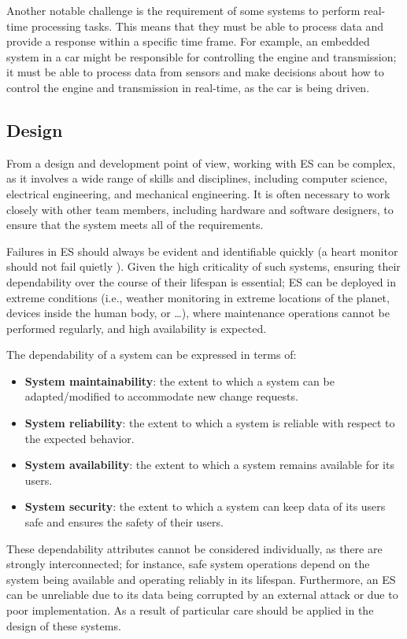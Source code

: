 Another notable challenge is the requirement of some systems to perform real-time processing tasks. This means that they must be able to process data and provide a response within a specific time frame. For example, an embedded system in a car might be responsible for controlling the engine and transmission; it must be able to process data from sensors and make decisions about how to control the engine and transmission in real-time, as the car is being driven.

\subsection{Design}
From a design and development point of view, working with ES can be complex, as it involves a wide range of skills and disciplines, including computer science, electrical engineering, and mechanical engineering. It is often necessary to work closely with other team members, including hardware and software designers, to ensure that the system meets all of the requirements.

Failures in ES should always be evident and identifiable quickly (a heart monitor should not fail quietly \cite{MakingEmbeddedSystems}). Given the high criticality of such systems, ensuring their dependability over the course of their lifespan is essential; ES can be deployed in extreme conditions (i.e., weather monitoring in extreme locations of the planet, devices inside the human body, or \dots), where maintenance operations cannot be performed regularly,  and high availability is expected. 

The dependability of a system can be expressed in terms of:
\begin{itemize}
    \item \textbf{System maintainability}: the extent to which a system can be adapted/modified to accommodate new change requests.
    \item \textbf{System reliability}: the extent to which a system is reliable with respect to the expected behavior.
    \item \textbf{System availability}: the extent to which a system remains available for its users.
    \item \textbf{System security}: the extent to which a system can keep data of its users safe and ensures the safety of their users.
\end{itemize}

These dependability attributes cannot be considered individually, as there are strongly interconnected; for instance, safe system operations depend on the system being available and operating reliably in its lifespan. Furthermore, an ES can be unreliable due to its data being corrupted by an external attack or due to poor implementation. As a result of particular care should be applied in the design of these systems. 


